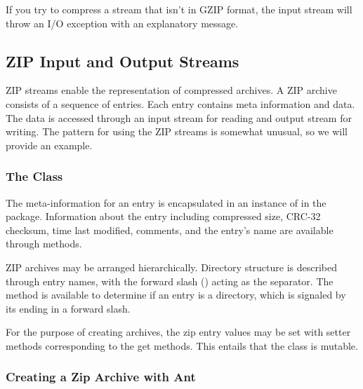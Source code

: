 If you try to compress a stream that isn't in GZIP format, the input
stream will throw an I/O exception with an explanatory message.


\subsection{ZIP Input and Output Streams}

ZIP streams enable the representation of compressed archives.  A ZIP
archive consists of a sequence of entries.  Each entry contains meta
information and data.  The data is accessed through an input stream
for reading and output stream for writing.  The pattern for using
the ZIP streams is somewhat unusual, so we will provide an example.

\subsubsection{The  Class}

The meta-information for an entry is encapsulated in an instance of
 in the  package.  Information
about the entry including compressed size, CRC-32 checksum, time last
modified, comments, and the entry's name are available through
methods.

ZIP archives may be arranged hierarchically.  Directory structure is
described through entry names, with the forward slash (\code{/})
acting as the separator.  The method  is available
to determine if an entry is a directory, which is signaled by its
ending in a forward slash.

For the purpose of creating archives, the zip entry values may
be set with setter methods corresponding to the get methods.  This
entails that the  class is mutable.

\subsubsection{Creating a Zip Archive with Ant}

